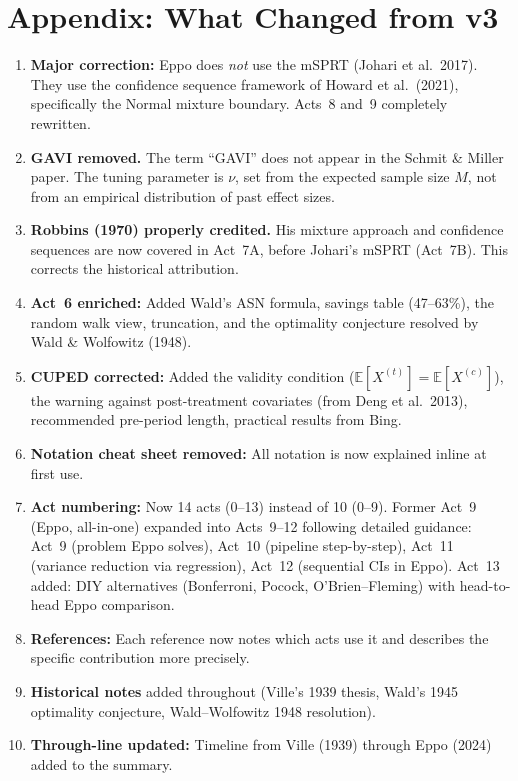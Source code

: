 \documentclass[12pt, a4paper]{article}
\newcommand{\E}{\mathbb{E}}            %
\begin{document}
\newpage
\section*{Appendix: What Changed from v3}

\begin{enumerate}[nosep]
  \item \textbf{Major correction:} Eppo does \emph{not} use the mSPRT
        (Johari et al.\ 2017).  They use the confidence sequence framework
        of Howard et al.\ (2021), specifically the Normal mixture boundary.
        Acts~8 and~9 completely rewritten.
  \item \textbf{GAVI removed.}  The term ``GAVI'' does not appear in the
        Schmit \& Miller paper.  The tuning parameter is $\nu$, set from the
        expected sample size $M$, not from an empirical distribution of past
        effect sizes.
  \item \textbf{Robbins (1970) properly credited.}  His mixture approach and
        confidence sequences are now covered in Act~7A, before Johari's mSPRT
        (Act~7B).  This corrects the historical attribution.
  \item \textbf{Act~6 enriched:} Added Wald's ASN formula, savings table
        (47--63\%), the random walk view, truncation, and the optimality
        conjecture resolved by Wald \& Wolfowitz (1948).
  \item \textbf{CUPED corrected:} Added the validity condition
        ($\E[X^{(t)}] = \E[X^{(c)}]$), the warning against post-treatment
        covariates (from Deng et al.\ 2013), recommended pre-period length,
        practical results from Bing.
  \item \textbf{Notation cheat sheet removed:} All notation is now explained
        inline at first use.
  \item \textbf{Act numbering:}  Now 14 acts (0--13) instead of 10 (0--9).
        Former Act~9 (Eppo, all-in-one) expanded into Acts~9--12 following
        detailed guidance: Act~9 (problem Eppo solves), Act~10 (pipeline
        step-by-step), Act~11 (variance reduction via regression), Act~12
        (sequential CIs in Eppo).  Act~13 added: DIY alternatives
        (Bonferroni, Pocock, O'Brien--Fleming) with head-to-head Eppo
        comparison.
  \item \textbf{References:}  Each reference now notes which acts use it and
        describes the specific contribution more precisely.
  \item \textbf{Historical notes} added throughout (Ville's 1939 thesis,
        Wald's 1945 optimality conjecture, Wald--Wolfowitz 1948 resolution).
  \item \textbf{Through-line updated:} Timeline from Ville (1939) through
        Eppo (2024) added to the summary.
\end{enumerate}
\end{document}
